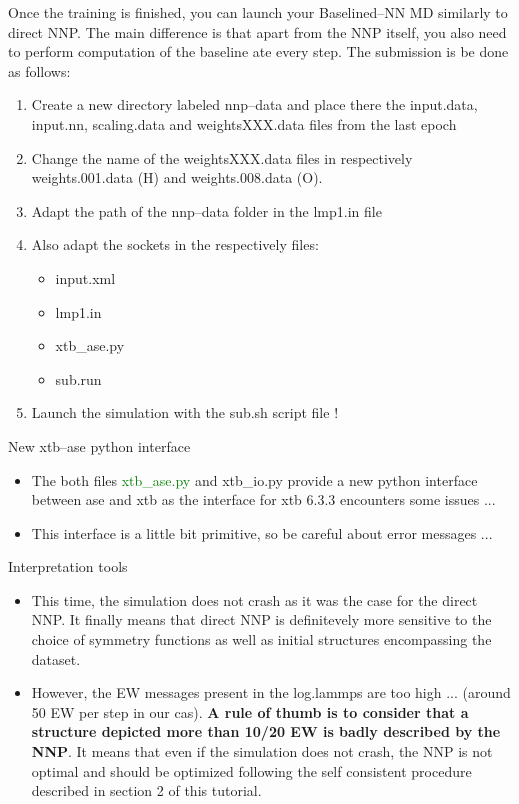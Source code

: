 \documentclass[12pt]{article}
\begin{document}
Once the training is finished, you can launch your Baselined--NN MD similarly to direct NNP. The main difference is that apart from the NNP itself, you also need to perform computation of the baseline ate every step. The submission is  be done as follows: 
\begin{enumerate}
    \item Create a new directory labeled nnp--data and place there the input.data, input.nn, scaling.data and weightsXXX.data files from the last epoch
    \item Change the name of the weightsXXX.data files in respectively weights.001.data (H) and weights.008.data (O).
    \item Adapt the path of the nnp--data folder in the lmp1.in file
    \item Also adapt the sockets in the respectively files:
    \begin{itemize}
        \item input.xml
        \item lmp1.in
        \item xtb\_ase.py
        \item sub.run
    \end{itemize}
    \item Launch the simulation with the sub.sh script file !
\end{enumerate}

\begin{mybox1}{New xtb--ase python interface}
\begin{itemize}
    \item The both files \textcolor{green}{xtb\_ase.py} and xtb\_io.py provide a new python interface between ase and xtb as the interface for xtb 6.3.3 encounters some issues ...
    \item This interface is a little bit primitive, so be careful about error messages ...
\end{itemize}
\end{mybox1}

\begin{mybox1}{Interpretation tools}
\begin{itemize}
    \item This time, the simulation does not crash as it was the case for the direct NNP. It finally means that direct NNP is definitevely more sensitive to the choice of symmetry functions as well as initial structures encompassing the dataset. 
    \item However, the EW messages present in the log.lammps are too high ... (around 50 EW per step in our cas). \textbf{A rule of thumb is to consider that a structure depicted more than 10/20 EW is badly described by the NNP}. It means that even if the simulation does not crash, the NNP is not optimal and should be optimized following the self consistent procedure described in section 2 of this tutorial.
\end{itemize}
\end{mybox1}
%
\end{document}
